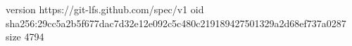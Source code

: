 version https://git-lfs.github.com/spec/v1
oid sha256:29cc5a2b5f677dac7d32e12e092c5c480c219189427501329a2d68ef737a0287
size 4794

